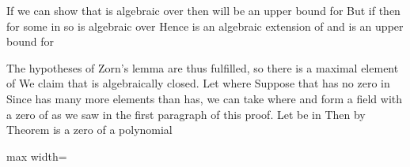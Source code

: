 \documentclass[11pt,oneside]{article}
\begin{document}
\begin{BookBody}
If we can show that  is algebraic over  then  will be an upper bound for  But if  then  for some  in  so \BookInline{\alpha } is algebraic over  Hence  is an algebraic extension of  and is an upper bound for 

The hypotheses of Zorn’s lemma are thus fulfilled, so there is a maximal element  of  We claim that  is algebraically closed. Let  where  Suppose that  has no zero in  Since \BookInline{\Omega } has many more elements than  has, we can take \BookInline{\omega \in \Omega,\allowbreak } where  and form a field  with \BookInline{\omega } a zero of  as we saw in the first paragraph of this proof. Let \BookInline{\beta } be in  Then by Theorem  is a zero of a polynomial

\begin{center}\begin{adjustbox}{max width=\linewidth}\end{adjustbox}\end{center}

\end{BookBody}

\BookNarrativetrue
\end{document}
